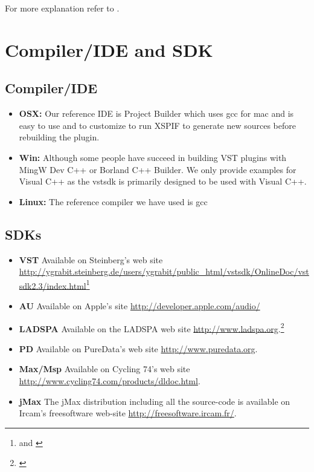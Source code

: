 \noindent For more explanation refer to \cite{pyxml:site}.

\section{Compiler/IDE and SDK}
\subsection{Compiler/IDE}
\begin{itemize}
\item \textbf{OSX:} Our reference IDE is Project Builder which uses gcc for
  mac and is easy to use and to customize to run XSPIF to generate new
		sources before rebuilding the plugin.
\item \textbf{Win:} Although some people have succeed in building VST
  plugins with MingW Dev C++ or Borland C++ Builder. We only provide
  examples for Visual C++ as the vstsdk is primarily designed to be
  used with Visual C++. 
\item \textbf{Linux:} The reference compiler we have used is gcc 
\end{itemize}
\subsection{SDKs}
\begin{itemize}
\item \textbf{VST} Available on Steinberg's web site
  \url{http://ygrabit.steinberg.de/users/ygrabit/public_html/vstsdk/OnlineDoc/vstsdk2.3/index.html}\footnote{\cite{vst:sdk} and \cite{vst:developers}} 
\item \textbf{AU} Available on Apple's site
  \url{http://developer.apple.com/audio/} 
\item \textbf{LADSPA} Available on the LADSPA web site
  \url{http://www.ladspa.org}.\footnote{\cite{LADSPA:site}} 
\item \textbf{PD} Available on PureData's web site
  \url{http://www.puredata.org}. 
\item \textbf{Max/Msp} Available on Cycling 74's web site
  \url{http://www.cycling74.com/products/dldoc.html}.
\item \textbf{jMax} The jMax distribution including all the
  source-code is available on Ircam's freesoftware web-site
  \url{http://freesoftware.ircam.fr/}.
\end{itemize}
